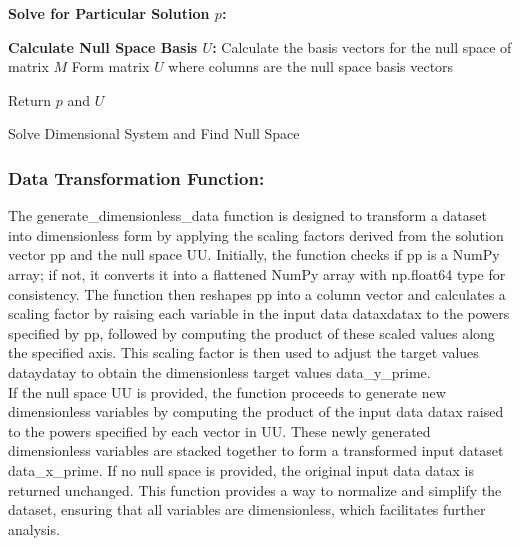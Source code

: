 \documentclass{article}
\begin{document}
\begin{algorithm}[H]
\SetAlgoLined
{}

\textbf{Solve for Particular Solution \(p\):}\;

\textbf{Calculate Null Space Basis \(U\):}\;
Calculate the basis vectors for the null space of matrix \(M\)\;
Form matrix \(U\) where columns are the null space basis vectors\;

Return \(p\) and \(U\)\;

\caption{Solve Dimensional System and Find Null Space}
\label{alg:solve_dimension} %
\end{algorithm}






\subsubsection{Data Transformation Function:}

The generate\_dimensionless\_data function is designed to transform a dataset into dimensionless form by applying the scaling factors derived from the solution vector pp and the null space UU. Initially, the function checks if pp is a NumPy array; if not, it converts it into a flattened NumPy array with np.float64 type for consistency. The function then reshapes pp into a column vector and calculates a scaling factor by raising each variable in the input data dataxdatax​ to the powers specified by pp, followed by computing the product of these scaled values along the specified axis. This scaling factor is then used to adjust the target values dataydatay​ to obtain the dimensionless target values data\_y\_prime.\\

If the null space UU is provided, the function proceeds to generate new dimensionless variables by computing the product of the input data datax raised to the powers specified by each vector in UU. These newly generated dimensionless variables are stacked together to form a transformed input dataset data\_x\_prime. If no null space is provided, the original input data datax is returned unchanged. This function provides a way to normalize and simplify the dataset, ensuring that all variables are dimensionless, which facilitates further analysis.\\
\end{document}
